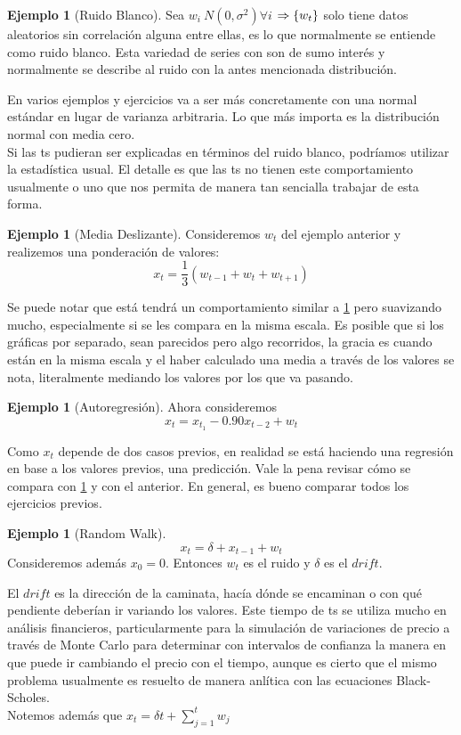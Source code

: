 \documentclass[11pt,a4paper,oneside]{report}
\theoremstyle{definition}
\newtheorem{ejemplo}[definicion]{Ejemplo}
\theoremstyle{plain}
\theoremstyle{remark}
\DeclarePairedDelimiter{\conj}{\{}{\}}
\begin{document}
\begin{ejemplo}[Ruido Blanco]\label{ej:ruido}
  Sea $w_i ~ N(0,\sigma^2) \forall i$ $\Rightarrow \conj{w_t}$ solo tiene datos aleatorios sin correlación
  alguna entre ellas, es lo que normalmente se entiende como ruido blanco. Esta variedad de series con 
  son de sumo interés y normalmente se describe al ruido con la antes mencionada distribución. 
\end{ejemplo}
  En varios ejemplos y ejercicios va a ser más concretamente con una normal estándar en lugar de varianza 
  arbitraria. Lo que más importa es la distribución normal con media cero.\\

Si las ts pudieran ser explicadas en términos del ruido blanco, podríamos utilizar la estadística usual. 
El detalle es que las ts no tienen este comportamiento usualmente o uno que nos permita de manera tan sencialla
trabajar de esta forma.

\begin{ejemplo}[Media Deslizante]
Consideremos $w_t$ del ejemplo anterior y realizemos una ponderación de valores:
\[ x_t=\frac{1}{3}(w_{t-1}+w_{t}+w_{t+1}) \]
\end{ejemplo}
Se puede notar que está tendrá un comportamiento similar a \cref{ej:ruido} pero suavizando mucho, especialmente
si se les compara en la misma escala. Es posible que si los gráficas por separado, sean parecidos pero algo recorridos,
la gracia es cuando están en la misma escala y el haber calculado una media a través de los valores se nota, literalmente
mediando los valores por los que va pasando.

\begin{ejemplo}[Autoregresión]
  Ahora consideremos
  \[x_t=x_{t_1}-0.90x_{t-2} +w_t \]

\end{ejemplo}
Como $x_t$ depende de dos casos previos, en realidad se está haciendo una regresión en base a los valores previos,
una predicción. Vale la pena revisar cómo se compara con \cref{ej:ruido} y con el anterior. En general, 
es bueno comparar todos los ejercicios previos. 

\begin{ejemplo}[Random Walk]
  \[ x_t=\delta + x_{t-1} + w_t\]
  Consideremos además $x_0=0$. Entonces $w_t$ es el ruido y $\delta$ es el $drift$. 
\end{ejemplo}
El $drift$ es la dirección de la caminata, hacía dónde se encaminan o con qué pendiente deberían ir 
variando los valores. Este tiempo de ts se utiliza mucho en análisis financieros, particularmente
para la simulación de variaciones de precio a través de Monte Carlo para determinar con intervalos
de confianza la manera en que puede ir cambiando el precio con el tiempo, aunque es cierto que 
el mismo problema usualmente es resuelto de manera anlítica con las ecuaciones Black-Scholes.\\
Notemos además que $x_t=\delta t + \sum_{j = 1}^{t}w_j$
\end{document}
